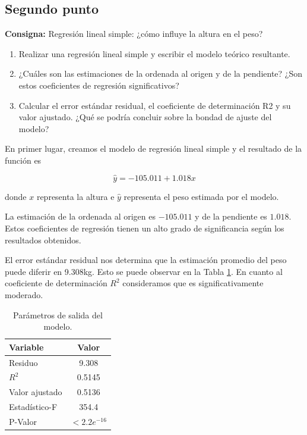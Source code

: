 \documentclass{article} %
\begin{document}
\subsection{Segundo punto}

\textbf{Consigna:} Regresión lineal simple: ¿cómo influye la altura en el peso?

\begin{enumerate}[label=(\alph*)]
\item Realizar una regresión lineal simple y escribir el modelo teórico resultante.
\item ¿Cuáles son las estimaciones de la ordenada al origen y de la pendiente? ¿Son estos coeficientes de regresión significativos?
\item Calcular el error estándar residual, el coeficiente de determinación R2 y su valor ajustado. ¿Qué se podría concluir sobre la bondad de ajuste del modelo?
\end{enumerate}

En primer lugar, creamos el modelo de regresión lineal simple y el resultado de la función es

\begin{equation}
\hat{y} = -105.011 + 1.018x
\end{equation}

donde $x$ representa la altura e $\hat{y}$ representa el peso estimada por el modelo.

La estimación de la ordenada al origen es $-105.011$ y de la pendiente es $1.018$. Estos coeficientes de regresión tienen un alto grado de significancia según los resultados obtenidos.

El error estándar residual nos determina que la estimación promedio del peso puede diferir en 9.308kg. Esto se puede observar en la Tabla \ref{tab:table-punto-1-2-c}. En cuanto al coeficiente de determinación $R^2$ consideramos que es significativamente moderado.

\begin{table}[H]
	\centering
		\begin{tabular}{||l | c ||}
			\hline
			\hline
			Variable & 	Valor\\
			\hline			
			\hline
			Residuo & 9.308\\
			\hline
			$R^2$ & 0.5145\\
			\hline
			Valor ajustado & 0.5136 \\
			\hline
			Estadístico-F & 354.4 \\
			\hline
			P-Valor & $<2.2e^{-16}$ \\
			\hline
			\hline
		\end{tabular}
		\caption{Parámetros de salida del modelo.}
	\label{tab:table-punto-1-2-c}
\end{table}
\end{document}
